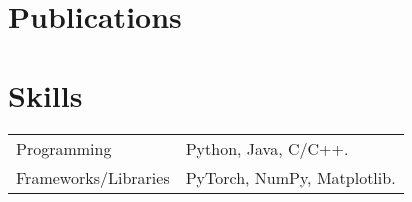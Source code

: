 \documentclass[a4paper,12pt]{article}
\begin{document}
\section{Publications}
\begin{refsection}
\nocite{*}
\printbibliography[heading=none]
\end{refsection}

\section{Skills}
\begin{tabularx}{\linewidth}{@{}l X@{}}
Programming &  \normalsize{Python, Java, C/C++.}\\
Frameworks/Libraries  &  \normalsize{PyTorch, NumPy, Matplotlib.}\\  
\end{tabularx}

\vfill
{}
\end{document}
